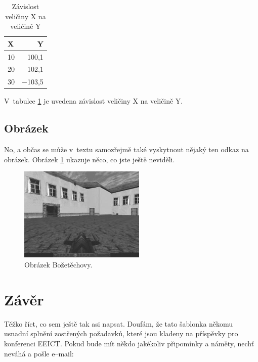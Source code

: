 \documentclass{eeict}
\begin{document}
\begin{table}[h]
\begin{center}
  \begin{tabular}{|l|r|}
    \hline
    X     &   Y      \\
    \hline
    10    &  100,1   \\
    20    &  102,1   \\
    30    & $-$103,5 \\
    \hline
  \end{tabular}
  \caption{
      \rm{
      \hspace{0.1cm} Závislost veličiny X na veličině Y}}
  \label{tabulka_1}
\end{center}
\end{table}

V~tabulce \ref{tabulka_1} je uvedena závislost veličiny X na veličině Y.

\subsection{Obrázek}

No, a občas se může v~textu samozřejmě také vyskytnout
nějaký ten odkaz na obrázek. Obrázek \ref{bozka_ss.jpg} ukazuje
něco, co jste ještě neviděli.

\begin{figure}[bht]
\begin{center}
  \includegraphics[width=6cm,keepaspectratio]{bozka_ss}
  \caption{
      \rm{
      \hspace{0.1cm} Obrázek Božetěchovy.}}
  \label{bozka_ss.jpg}
\end{center}
\end{figure}

\section{Závěr}
Těžko říct, co sem ještě tak asi napsat. Doufám, že tato šablonka někomu usnadní
splnění zostřených požadavků, které jsou kladeny na příspěvky pro konferenci
EEICT. Pokud bude mít někdo jakékoliv připomínky a náměty, nechť neváhá a
pošle e–mail:
\end{document}
